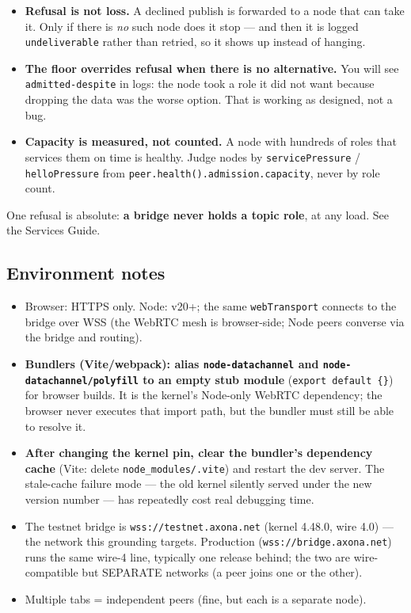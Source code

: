 \documentclass[
  nobib]{tufte-handout}
\providecommand{\tightlist}{%
  \setlength{\itemsep}{0pt}\setlength{\parskip}{0pt}}
\begin{document}
\begin{itemize}
\tightlist
\item
  \textbf{Refusal is not loss.} A declined publish is forwarded to a
  node that can take it. Only if there is \emph{no} such node does it
  stop --- and then it is logged \texttt{undeliverable} rather than
  retried, so it shows up instead of hanging.
\item
  \textbf{The floor overrides refusal when there is no alternative.} You
  will see \texttt{admitted-despite} in logs: the node took a role it
  did not want because dropping the data was the worse option. That is
  working as designed, not a bug.
\item
  \textbf{Capacity is measured, not counted.} A node with hundreds of
  roles that services them on time is healthy. Judge nodes by
  \texttt{servicePressure} / \texttt{helloPressure} from
  \texttt{peer.health().admission.capacity}, never by role count.
\end{itemize}

One refusal is absolute: \textbf{a bridge never holds a topic role}, at
any load. See the Services Guide.

\subsection{Environment notes}\label{environment-notes}

\begin{itemize}
\tightlist
\item
  Browser: HTTPS only. Node: v20+; the same \texttt{webTransport}
  connects to the bridge over WSS (the WebRTC mesh is browser-side; Node
  peers converse via the bridge and routing).
\item
  \textbf{Bundlers (Vite/webpack): alias \texttt{node-datachannel} and
  \texttt{node-datachannel/polyfill} to an empty stub module}
  (\texttt{export\ default\ \{\}}) for browser builds. It is the
  kernel's Node-only WebRTC dependency; the browser never executes that
  import path, but the bundler must still be able to resolve it.
\item
  \textbf{After changing the kernel pin, clear the bundler's dependency
  cache} (Vite: delete \texttt{node\_modules/.vite}) and restart the dev
  server. The stale-cache failure mode --- the old kernel silently
  served under the new version number --- has repeatedly cost real
  debugging time.
\item
  The testnet bridge is \texttt{wss://testnet.axona.net} (kernel 4.48.0,
  wire 4.0) --- the network this grounding targets. Production
  (\texttt{wss://bridge.axona.net}) runs the same wire-4 line, typically
  one release behind; the two are wire-compatible but SEPARATE networks
  (a peer joins one or the other).
\item
  Multiple tabs = independent peers (fine, but each is a separate node).
\end{itemize}
\end{document}
